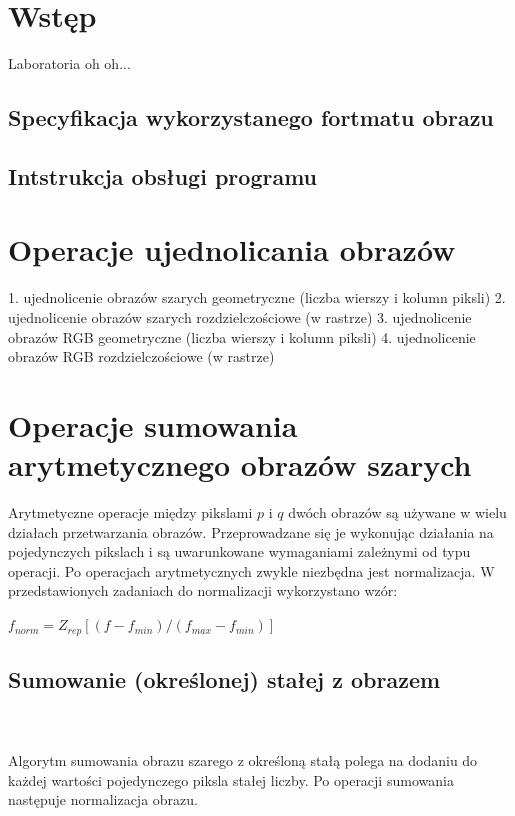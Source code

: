 \documentclass[final,a4paper,openany,12pt]{mwbk}
\begin{document}
\tableofcontents
\listoffigures

\sloppy


\chapter {Wstęp}

Laboratoria oh oh...~\cite{BookMok} %


\section {Specyfikacja wykorzystanego fortmatu obrazu}

\section {Intstrukcja obsługi programu}



\chapter{Operacje ujednolicania obrazów}
1. ujednolicenie obrazów szarych geometryczne (liczba wierszy i kolumn piksli)
2. ujednolicenie obrazów szarych rozdzielczościowe (w rastrze)
3. ujednolicenie obrazów RGB geometryczne (liczba wierszy i kolumn piksli)
4. ujednolicenie obrazów RGB rozdzielczościowe (w rastrze)

\chapter{Operacje sumowania arytmetycznego obrazów szarych}

Arytmetyczne operacje między pikslami $p$ i $q$ dwóch obrazów są używane w wielu działach przetwarzania obrazów. Przeprowadzane się je wykonując działania na pojedynczych pikslach i są uwarunkowane wymaganiami zależnymi od typu operacji. 
Po operacjach arytmetycznych zwykle niezbędna jest normalizacja. W przedstawionych zadaniach do normalizacji wykorzystano wzór:
	
	\begin{center}
		$ f_{norm} = Z_{rep}[(f - f_{min}) / (f_{max} - f_{min})] $
	\end{center}

\section {Sumowanie (określonej) stałej z obrazem}
\hfill
\\\\
\indent
Algorytm sumowania obrazu szarego z określoną stałą polega na dodaniu do każdej wartości pojedynczego piksla stałej liczby.
Po operacji sumowania następuje normalizacja obrazu.
\end{document}
